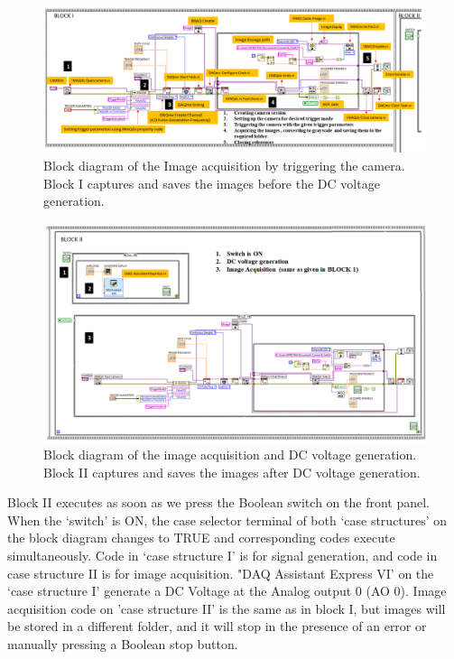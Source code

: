 \documentclass[journal=jacsat,manuscript=article]{achemso}
\begin{document}
\begin{figure}[H]
    \centering
    \includegraphics[width=1.3\linewidth,angle=90 ]{Block_1.png}
    \caption{Block diagram of the Image acquisition by triggering the
      camera. Block I captures and saves the images before the DC
      voltage generation.}
    \label{fig:ex4}
\end{figure}

\begin{figure}[H]
    \centering
    \includegraphics[width=1.3\linewidth,angle=90]{Block_2.png}
    \caption{Block diagram of the image acquisition and DC voltage
      generation. Block II captures and saves the images after DC
      voltage generation.}
    \label{fig:ex5}
\end{figure}
Block II executes as soon as we press the Boolean switch on the front
panel. When the ‘switch’ is ON, the case selector terminal of both
‘case structures’ on the block diagram changes to TRUE and
corresponding codes execute simultaneously. Code in ‘case structure I’
is for signal generation, and code in case structure II is for image
acquisition. "DAQ Assistant Express VI' on the ‘case structure I’
generate a DC Voltage at the Analog output 0 (AO 0). Image acquisition
code on 'case structure II' is the same as in block I, but images will
be stored in a different folder, and it will stop in the presence of
an error or manually pressing a Boolean stop button.
\end{document}
